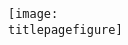 \begin{titlepage}
\centering
    \Large
    \organizationname\\
    \vspace{2cm}
    
    \LARGE
    \textbf{\maintitle}
    \vspace {0.5cm}
    
    \Large
    \subtitle
    \vspace*{2cm}
    \texttt{[image: \\titlepagefigure]}
    
    \vfill
    
    \Large
    \coursename\\
    
    \textbf{\dateline}\\
    
    \vspace*{1cm}
    
    \small{}
    
    
\end{titlepage}